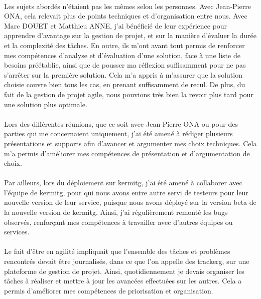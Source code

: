 \documentclass[12pt,a4paper]{report}
\begin{document}
\paragraph*{}Les sujets abordés n’étaient pas les mêmes selon les personnes. Avec
Jean-Pierre ONA, cela relevait plus de points techniques et d’organisation entre nous. Avec Marc DOUET et Matthieu ANNE, j’ai bénéficié de leur expérience pour apprendre
d’avantage sur la gestion de projet, et sur la manière d’évaluer la durée et la complexité des tâches. En outre, ils m’ont avant tout permis de renforcer mes compétences d’analyse et d’évaluation d’une solution, face à une liste de besoins préétablie, ainsi que de pousser ma réflexion suffisamment pour ne pas s’arrêter sur la première solution. Cela m’a appris à m’assurer que la solution choisie couvre bien tous les cas, en prenant suffisamment de recul. De plus, du fait de la gestion de projet agile, nous pouvions très bien la revoir plus tard pour une solution plus optimale.
\paragraph*{}Lors des différentes réunions, que ce soit avec Jean-Pierre ONA ou pour
des parties qui me concernaient uniquement, j’ai été amené à rédiger plusieurs
présentations et supports afin d’avancer et argumenter mes choix techniques. Cela m’a
permis d’améliorer mes compétences de présentation et d’argumentation de choix.
\paragraph*{}Par ailleurs, lors du déploiement sur \gls{kermitg}, j’ai été amené à collaborer
avec l’équipe de \gls{kermitg}, pour qui nous avons entre autre servi de testeurs pour leur nouvelle version de leur service, puisque nous avons déployé sur la version beta de la nouvelle version de \gls{kermitg}. Ainsi, j’ai régulièrement remonté les bugs observés, renforçant mes compétences à travailler avec d’autres équipes ou services.
\paragraph*{}Le fait d’être en agilité impliquait que l’ensemble des tâches et problèmes rencontrés devait être journalisés, dans ce que l’on appelle des \gls{trackerg}, sur une plateforme de gestion de projet. Ainsi, quotidiennement je devais organiser les tâches à réaliser et mettre à jour les avancées effectuées sur les autres. Cela a permis d’améliorer mes compétences de priorisation et organisation.
\end{document}
